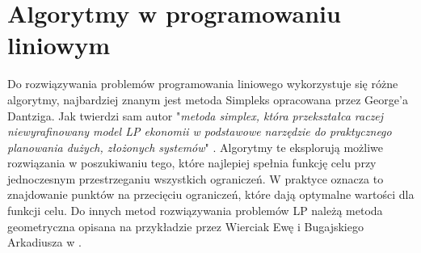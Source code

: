\section{Algorytmy w programowaniu liniowym}
\par Do rozwiązywania problemów programowania liniowego wykorzystuje się różne algorytmy, najbardziej znanym jest metoda Simpleks opracowana przez George'a Dantziga. Jak twierdzi sam autor "\textit{metoda simplex, która przekształca raczej niewyrafinowany model LP ekonomii w podstawowe narzędzie do praktycznego planowania dużych, złożonych systemów}" \parencite{dantzig2002linear}. Algorytmy te eksplorują możliwe rozwiązania w poszukiwaniu tego, które najlepiej spełnia funkcję celu przy jednoczesnym przestrzeganiu wszystkich ograniczeń. W praktyce oznacza to znajdowanie punktów na przecięciu ograniczeń, które dają optymalne wartości dla funkcji celu. Do innych metod rozwiązywania problemów LP należą metoda geometryczna opisana na przykładzie przez Wierciak Ewę i Bugajskiego Arkadiusza w \parencite{BibEntry2024Jun}.
    

    


